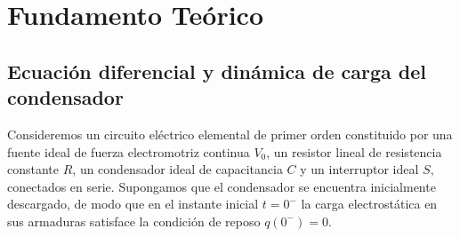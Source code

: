 
\section{Fundamento Teórico}
\label{sec:fundamento}

\subsection{Ecuación diferencial y dinámica de carga del condensador}

Consideremos un circuito eléctrico elemental de primer orden constituido por una fuente ideal de fuerza electromotriz continua $V_0$, un resistor lineal de resistencia constante $R$, un condensador ideal de capacitancia $C$ y un interruptor ideal $S$, conectados en serie. Supongamos que el condensador se encuentra inicialmente descargado, de modo que en el instante inicial $t = 0^-$ la carga electrostática en sus armaduras satisface la condición de reposo $q(0^-) = 0$.

